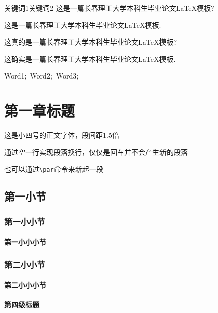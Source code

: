 \documentclass{CustGraduPaper}
\begin{document}
\author{姓名}
\makecover
\makestatement

\begin{cnabstract}{关键词1\quad 关键词2}%
	这是一篇长春理工大学本科生毕业论文\LaTeX 模板?

	这是一篇长春理工大学本科生毕业论文\LaTeX 模板.

	这真的是一篇长春理工大学本科生毕业论文\LaTeX 模板?

	这确实是一篇长春理工大学本科生毕业论文\LaTeX 模板.
\end{cnabstract}
\begin{enabstract}{Word1;~Word2;~Word3;}
	\lipsum[1]

	\lipsum[2]

	\lipsum[3]
\end{enabstract}


\makecontents %
\chapter{第一章标题}
这是小四号的正文字体，段间距1.5倍

通过空一行实现段落换行，仅仅是回车并不会产生新的段落
\par 也可以通过\verb|\par|命令来新起一段
\section{第一小节}
\subsection{第一小小节}
\subsubsection{第一小小小节}
\subsection{第二小小节}
\subsubsection{第二小小小节}\label{subsubsubsec:subsubsubsec}

\subsubsection{第四级标题}
\end{document}
